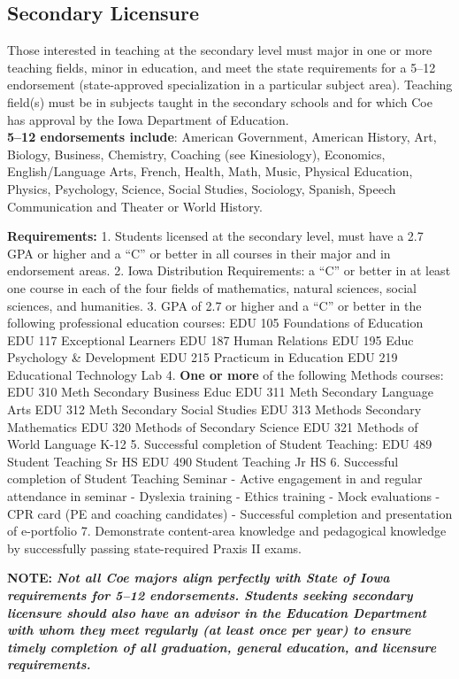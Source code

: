 \documentclass[
  letterpaper,
]{scrbook}
\begin{document}
\subsection{Secondary Licensure}\label{secondary-licensure}

Those interested in teaching at the secondary level must major in one or
more teaching fields, minor in education, and meet the state
requirements for a 5--12 endorsement (state-approved specialization in a
particular subject area). Teaching field(s) must be in subjects taught
in the secondary schools and for which Coe has approval by the Iowa
Department of Education.\\
\textbf{5--12 endorsements include}: American Government, American
History, Art, Biology, Business, Chemistry, Coaching (see Kinesiology),
Economics, English/Language Arts, French, Health, Math, Music, Physical
Education, Physics, Psychology, Science, Social Studies, Sociology,
Spanish, Speech Communication and Theater or World History.

\textbf{Requirements:} 1. Students licensed at the secondary level, must
have a 2.7 GPA or higher and a ``C'' or better in all courses in their
major and in endorsement areas. 2. Iowa Distribution Requirements: a
``C'' or better in at least one course in each of the four fields of
mathematics, natural sciences, social sciences, and humanities. 3. GPA
of 2.7 or higher and a ``C'' or better in the following professional
education courses: EDU 105 Foundations of Education EDU 117 Exceptional
Learners EDU 187 Human Relations EDU 195 Educ Psychology \& Development
EDU 215 Practicum in Education EDU 219 Educational Technology Lab 4.
\textbf{One or more} of the following Methods courses: EDU 310 Meth
Secondary Business Educ EDU 311 Meth Secondary Language Arts EDU 312
Meth Secondary Social Studies EDU 313 Methods Secondary Mathematics EDU
320 Methods of Secondary Science EDU 321 Methods of World Language K-12
5. Successful completion of Student Teaching: EDU 489 Student Teaching
Sr HS EDU 490 Student Teaching Jr HS 6. Successful completion of Student
Teaching Seminar - Active engagement in and regular attendance in
seminar - Dyslexia training - Ethics training - Mock evaluations - CPR
card (PE and coaching candidates) - Successful completion and
presentation of e-portfolio 7. Demonstrate content-area knowledge and
pedagogical knowledge by successfully passing state-required Praxis II
exams.

\textbf{NOTE:} \textbf{\emph{Not all Coe majors align perfectly with
State of Iowa requirements for 5--12 endorsements. Students seeking
secondary licensure should also have an advisor in the Education
Department with whom they meet regularly (at least once per year) to
ensure timely completion of all graduation, general education, and
licensure requirements.}}
\end{document}
